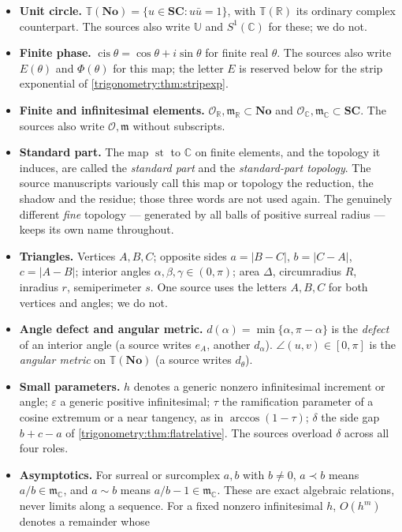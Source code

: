 \documentclass[11pt,letterpaper]{article}
\numberwithin{equation}{section}
\theoremstyle{definition}
\theoremstyle{remark}
\newcommand{\No}{\mathbf{No}}
\newcommand{\SC}{\mathbf{SC}}
\newcommand{\R}{\mathbb R}
\newcommand{\C}{\mathbb C}
\newcommand{\OO}{\mathcal O}
\newcommand{\mm}{\mathfrak m}
\newcommand{\TT}{\mathbb T}
\newcommand{\eps}{\varepsilon}
\newcommand{\st}{\operatorname{st}}
\newcommand{\cis}{\operatorname{cis}}
\newcommand{\ang}[2]{\angle(#1,#2)}
\begin{document}
\begin{itemize}
\item \textbf{Unit circle.} $\TT(\No)=\{u\in\SC:u\bar u=1\}$, with $\TT(\R)$ its ordinary complex
 counterpart. The sources also write $\mathbb U$ and $S^1(\C)$ for these; we do not.
\item \textbf{Finite phase.} $\cis\theta=\cos\theta+i\sin\theta$ for finite real $\theta$. The
 sources also write $E(\theta)$ and $\Phi(\theta)$ for this map; the letter $E$ is reserved below
 for the strip exponential of \cref{trigonometry:thm:stripexp}.
\item \textbf{Finite and infinitesimal elements.} $\OO_{\R},\mm_{\R}\subset\No$ and
 $\OO_{\C},\mm_{\C}\subset\SC$. The sources also write $\OO,\mm$ without subscripts.
\item \textbf{Standard part.} The map $\st$ to $\C$ on finite elements, and the topology it
 induces, are called the \emph{standard part} and the \emph{standard-part topology}. The source
 manuscripts variously call this map or topology the reduction, the shadow and the residue; those
 three words are not used again. The genuinely different \emph{fine} topology --- generated by all
 balls of positive surreal radius --- keeps its own name throughout.
\item \textbf{Triangles.} Vertices $A,B,C$; opposite sides $a=|B-C|$, $b=|C-A|$, $c=|A-B|$;
 interior angles $\alpha,\beta,\gamma\in(0,\pi)$; area $\Delta$, circumradius $R$, inradius $r$,
 semiperimeter $s$. One source uses the letters $A,B,C$ for both vertices and angles; we do not.
\item \textbf{Angle defect and angular metric.} $d(\alpha)=\min\{\alpha,\pi-\alpha\}$ is the
 \emph{defect} of an interior angle (a source writes $e_A$, another $d_\alpha$).
 $\ang uv\in[0,\pi]$ is the \emph{angular metric} on $\TT(\No)$ (a source writes $d_\theta$).
\item \textbf{Small parameters.} $h$ denotes a generic nonzero infinitesimal increment or angle;
 $\eps$ a generic positive infinitesimal; $\tau$ the ramification parameter of a cosine extremum
 or a near tangency, as in $\arccos(1-\tau)$; $\delta$ the side gap $b+c-a$ of
 \cref{trigonometry:thm:flatrelative}. The sources overload $\delta$ across all four roles.
\item \textbf{Asymptotics.} For surreal or surcomplex $a,b$ with $b\ne0$,
 $a\prec b$ means $a/b\in\mm_{\C}$, and $a\sim b$ means
 $a/b-1\in\mm_{\C}$. These are exact algebraic relations, never limits
 along a sequence. For a fixed nonzero infinitesimal $h$, $O(h^m)$ denotes a remainder whose

\end{itemize}
\end{document}
